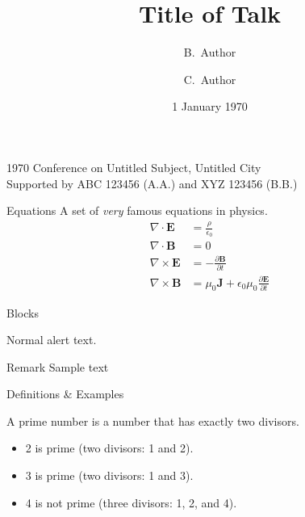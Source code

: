 \documentclass[noamssymb,noamsmath,aspectratio=169,9pt]{beamer}
\title{Title of Talk}
\author{\texorpdfstring{\altalert{\textbf{A.~Author}}}{A.~Author} \and B.~Author \and C.~Author}
\institute{Untitled Department, Untitled Institute}
\date{1 January 1970}
\begin{document}
\begin{frame}
  \titlepage
  \begin{center}
    {\small 1970 Conference on Untitled Subject, Untitled City\\[\baselineskip]}
    {\footnotesize Supported by ABC 123456 (A.A.) and XYZ 123456 (B.B.)}
  \end{center}
\end{frame}

\begin{frame}{Equations}
  A set of \emph{very} famous equations in physics.
  \begin{align*}
    \nabla\cdot\mathbf{E} &= \frac{\rho}{\epsilon_0}\\
    \nabla\cdot\mathbf{B} &= 0\\
    \nabla\times\mathbf{E} &= -\frac{\partial\mathbf{B}}{\partial{t}}\\
    \nabla\times\mathbf{B} &= \mu_0\mathbf{J} + \epsilon_0\mu_0\frac{\partial\mathbf{E}}{\partial{t}}
  \end{align*}
\end{frame}

\begin{frame}{Blocks}

\alert{Normal alert text.} 

\begin{block}{Remark}
Sample text
\end{block}

\end{frame}

\begin{frame}{Definitions \& Examples}
  \begin{definition}
    A \alert{prime number} is a number that has exactly two divisors.
  \end{definition}
  \begin{example}
  \begin{itemize}
    \item 2 is prime (two divisors: 1 and 2).
    \item 3 is prime (two divisors: 1 and 3).
    \item 4 is not prime (\alert{three} divisors: 1, 2, and 4).
  \end{itemize}
  \end{example}
\end{frame}
\end{document}
